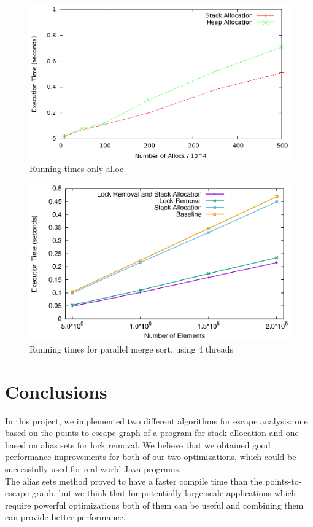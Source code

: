 \documentclass[letterpaper]{article}
\begin{document}
\begin{figure} \center
 \includegraphics[width=0.8\linewidth]{results_only_alloc.eps}
  \caption{Running times only alloc}
  \label{fig:alloc}
\end{figure}

\begin{figure} \center
 \includegraphics[width=0.8\linewidth]{results_merge.eps}
  \caption{Running times for parallel merge sort, using 4 threads}
  \label{fig:merge}
\end{figure}

\section{Conclusions}

In this project, we implemented two different algorithms for escape analysis:
one based on the points-to-escape graph of a program for stack allocation and one based
on alias sets for lock removal. We believe that we obtained good performance improvements
for both of our two optimizations, which could be successfully used for real-world Java programs.\\
The alias sets method proved to have a faster compile time than the points-to-escape graph, but we
think that for potentially large scale applications which require powerful optimizations both of them
can be useful and combining them can provide better performance.



\end{document}
